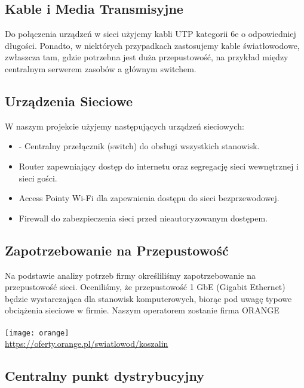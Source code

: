 \subsection{Kable i Media Transmisyjne}

    Do połączenia urządzeń w sieci użyjemy kabli UTP kategorii 6e o odpowiedniej długości. Ponadto, w niektórych przypadkach zastosujemy kable światłowodowe, zwłaszcza tam, gdzie potrzebna jest duża przepustowość, na przykład między centralnym serwerem zasobów a głównym switchem.

\subsection{Urządzenia Sieciowe}
    W naszym projekcie użyjemy następujących urządzeń sieciowych:
    \begin{itemize}
        \item - Centralny przełącznik (switch) do obsługi wszystkich stanowisk.
        \item Router zapewniający dostęp do internetu oraz segregację sieci wewnętrznej i sieci gości.
        \item Access Pointy Wi-Fi dla zapewnienia dostępu do sieci bezprzewodowej.
        \item Firewall do zabezpieczenia sieci przed nieautoryzowanym dostępem.
    \end{itemize}



\subsection{Zapotrzebowanie na Przepustowość}

    Na podstawie analizy potrzeb firmy określiliśmy zapotrzebowanie na przepustowość sieci. Oceniliśmy, że przepustowość 1 GbE (Gigabit Ethernet) będzie wystarczająca dla stanowisk komputerowych, biorąc pod uwagę typowe obciążenia sieciowe w firmie. 
    Naszym operatorem zostanie firma ORANGE\\ \\
    \texttt{[image: orange]} \\
     \url{https://oferty.orange.pl/swiatlowod/koszalin}

\subsection{Centralny punkt dystrybucyjny}

